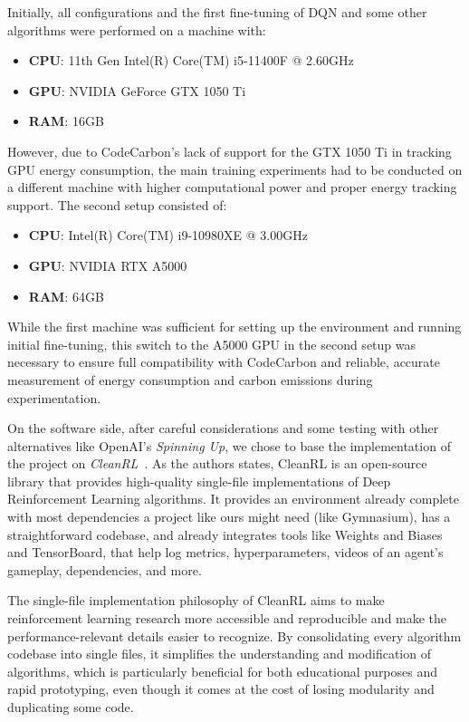 Initially, all configurations and the first fine-tuning of DQN and some other algorithms were performed on a machine with:
\begin{itemize}
	\item \textbf{CPU}: 11th Gen Intel(R) Core(TM) i5-11400F @ 2.60GHz
	\item \textbf{GPU}: NVIDIA GeForce GTX 1050 Ti
	\item \textbf{RAM}: 16GB
\end{itemize}

However, due to CodeCarbon's lack of support for the GTX 1050 Ti in tracking GPU energy consumption, the main training experiments had to be conducted on a different machine with higher computational power and proper energy tracking support. The second setup consisted of:
\begin{itemize}
	\item \textbf{CPU}: Intel(R) Core(TM) i9-10980XE @ 3.00GHz
	\item \textbf{GPU}: NVIDIA RTX A5000
	\item \textbf{RAM}: 64GB
\end{itemize}
While the first machine was sufficient for setting up the environment and running initial fine-tuning, this switch to the A5000 GPU in the second setup was necessary to ensure full compatibility with CodeCarbon and reliable, accurate measurement of energy consumption and carbon emissions during experimentation.

On the software side, after careful considerations and some testing with other alternatives like OpenAI's \textit{Spinning Up}, we chose to base the implementation of the project on \textit{CleanRL}~\cite{huang:cleanrl}. As the authors states, CleanRL is an open-source library that provides high-quality single-file implementations of Deep Reinforcement Learning algorithms. It provides an environment already complete with most dependencies a project like ours might need (like Gymnasium), has a straightforward codebase, and already integrates tools like Weights and Biases and TensorBoard, that help log metrics, hyperparameters, videos of an agent's gameplay, dependencies, and more.

The single-file implementation philosophy of CleanRL aims to make reinforcement learning research more accessible and reproducible and make the performance-relevant details easier to recognize. By consolidating every algorithm codebase into single files, it simplifies the understanding and modification of algorithms, which is particularly beneficial for both educational purposes and rapid prototyping, even though it comes at the cost of losing modularity and duplicating some code.

